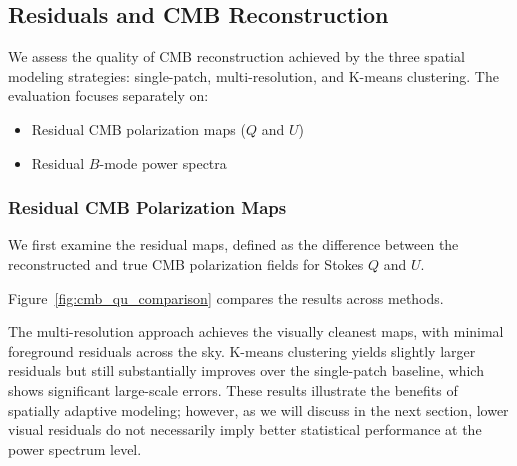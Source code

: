 \documentclass[%
 reprint,
bibnotes,
 amsmath,amssymb,
 aps,
floatfix, 
]{revtex4-2}
\begin{document}
\subsection{Residuals and CMB Reconstruction}
\label{sec:residuals_reconstruction}

We assess the quality of CMB reconstruction achieved by the three spatial modeling strategies: single-patch, multi-resolution, and K-means clustering.  
The evaluation focuses separately on:
\begin{itemize}
    \item Residual CMB polarization maps (\( Q \) and \( U \))
    \item Residual \( B \)-mode power spectra
\end{itemize}

\subsubsection*{Residual CMB Polarization Maps}
\label{subsec:residual_maps}

We first examine the residual maps, defined as the difference between the reconstructed and true CMB polarization fields for Stokes \( Q \) and \( U \).

Figure~\ref{fig:cmb_qu_comparison} compares the results across methods.

The multi-resolution approach achieves the visually cleanest maps, with minimal foreground residuals across the sky.  
K-means clustering yields slightly larger residuals but still substantially improves over the single-patch baseline, which shows significant large-scale errors.  
These results illustrate the benefits of spatially adaptive modeling; however, as we will discuss in the next section, lower visual residuals do not necessarily imply better statistical performance at the power spectrum level.
\end{document}
